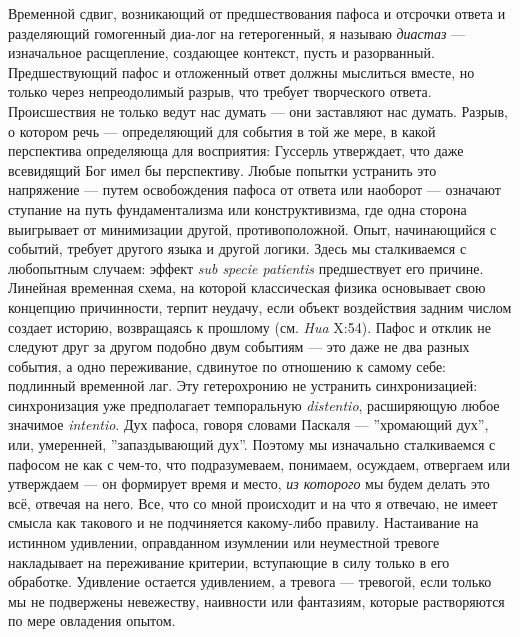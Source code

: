 \documentclass[12pt]{book}
\begin{document}
Временной сдвиг, возникающий от предшествования пафоса и отсрочки ответа и разделяющий гомогенный диа-лог на гетерогенный, я называю \textit{диастаз} --- изначальное расщепление, создающее контекст, пусть и разорванный. Предшествующий пафос и отложенный ответ должны мыслиться вместе, но только через непреодолимый разрыв, что требует творческого ответа. Происшествия не только ведут нас думать --- они заставляют нас думать. Разрыв, о котором речь --- определяющий для события в той же мере, в какой перспектива определяюща для восприятия: Гуссерль утверждает, что даже всевидящий Бог имел бы перспективу. Любые попытки устранить это напряжение --- путем освобождения пафоса от ответа или наоборот --- означают ступание на путь фундаментализма или конструктивизма, где одна сторона выигрывает от минимизации другой, противоположной. Опыт, начинающийся с событий, требует другого языка и другой логики. Здесь мы сталкиваемся с любопытным случаем: эффект \textit{sub specie patientis} предшествует его причине. Линейная временная схема, на которой классическая физика основывает свою концепцию причинности, терпит неудачу, если объект воздействия задним числом создает историю, возвращаясь к прошлому (см. \textit{Hua} X:54). Пафос и отклик не следуют друг за другом подобно двум событиям --- это даже не два разных события, а одно переживание, сдвинутое по отношению к самому себе: подлинный временной лаг. Эту гетерохронию не устранить синхронизацией: синхронизация уже предполагает темпоральную \textit{distentio}, расширяющую любое значимое \textit{intentio}. Дух пафоса, говоря словами Паскаля --- ''хромающий дух'', или, умеренней, ''запаздывающий дух''. Поэтому мы изначально сталкиваемся с пафосом не как с чем-то, что подразумеваем, понимаем, осуждаем, отвергаем или утверждаем --- он формирует время и место, \textit{из которого} мы будем делать это всё, отвечая на него. Все, что со мной происходит и на что я отвечаю, не имеет смысла как такового и не подчиняется какому-либо правилу. Настаивание на истинном удивлении, оправданном изумлении или неуместной тревоге накладывает на переживание критерии, вступающие в силу только в его обработке. Удивление остается удивлением, а тревога --- тревогой, если только мы не подвержены невежеству, наивности или фантазиям, которые растворяются по мере овладения опытом.
\end{document}
